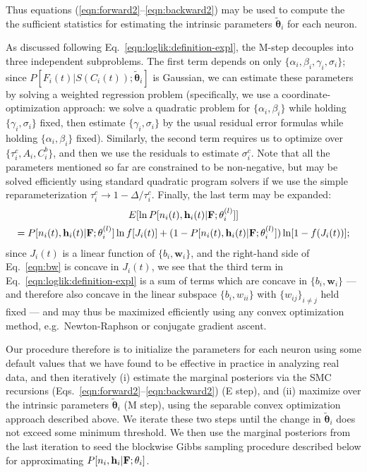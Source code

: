 \documentclass[aoas,preprint]{imsart}
\providecommand{\tr}[1]{\textcolor{red}{#1}}
\newcommand{\bth}{\mathbf{\theta}}
\newcommand{\w}{w}
\newcommand{\bw}{\mathbf{\w}}
\newcommand{\bF}{{\bf F}}
\newcommand{\bh}{\mathbf{h}}
\newcommand{\tbth}{\tilde{\bth}}
\begin{document}
Thus equations (\ref{eqn:forward2}--\ref{eqn:backward2}) may be used
to compute the the sufficient statistics for estimating the
intrinsic parameters $\tbth_i$ for each neuron.

As discussed following Eq.~\eqref{eqn:loglik:definition-expl}, the
M-step decouples into three independent subproblems. The first term
depends on only $\{\alpha_i, \beta_i, \gamma_i, \sigma_i\}$; since
$P[F_i(t)|S(C_i(t)); \tbth_i]$ is Gaussian, we can estimate these
parameters by solving a weighted regression problem (specifically, we
use a coordinate-optimization approach: we solve a quadratic problem
for $\{\alpha_i, \beta_i\}$ while holding $\{\gamma_i, \sigma_i\}$
fixed, then estimate $\{\gamma_i,\sigma_i\}$ by the usual residual
error formulas while holding $\{\alpha_i, \beta_i\}$
fixed). Similarly, the second term requires us to optimize over
$\{\tau_i^c, A_i, C_i^b\}$, and then we use the residuals to estimate
$\sigma_i^c$. Note that all the parameters mentioned so far are
constrained to be non-negative, but may be solved efficiently using
standard quadratic program solvers if we use the simple
reparameterization $\tau_i^c \to 1- \Delta / \tau_i^c$. Finally, the
last term may be expanded:
\tr{\begin{multline}
E [\ln P[n_i(t), \bh_i(t) | \bF; \bth_i^{(l)}]] \\ = P[n_i(t), \bh_i(t) | \bF; \bth_i^{(l)}] \ln f [J_i(t)] + (1-P[n_i(t), \bh_i(t) | \bF; \bth_i^{(l)}]) \ln [1- f(J_i(t))];
\label{eqn:bw}
\end{multline}}
since $J_i(t)$ is a linear function of $\{b_i,\bw_i\}$, and the
right-hand side of Eq.~\eqref{eqn:bw} is concave in $J_i(t)$, we see
that the third term in Eq.~\eqref{eqn:loglik:definition-expl} is a sum
of terms which are concave in $\{b_i,\bw_i\}$ --- and therefore also
concave in the linear subspace $\{b_i,w_{ii}\}$ with $\{w_{ij}\}_{i
\neq j}$ held fixed --- and may thus be maximized efficiently using
any convex optimization method, e.g.\ Newton-Raphson or conjugate
gradient ascent.

Our procedure therefore is to initialize the parameters for each
neuron using some default values that we have found to be effective in
practice in analyzing real data, and then iteratively (i) estimate the
marginal posteriors via the SMC recursions
(Eqs.~\eqref{eqn:forward2}--\eqref{eqn:backward2}) (E step), and (ii)
maximize over the intrinsic parameters $\tbth_i$ (M step), using the
separable convex optimization approach described above. We iterate
these two steps until the change in $\tbth_i$ does not exceed some
minimum threshold. We then use the marginal posteriors from the last
iteration to seed the blockwise Gibbs sampling procedure described
below for approximating $P[n_i,\bh_i | \bF;\bth_i]$.
\end{document}
